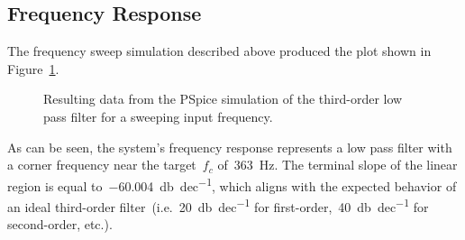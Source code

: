\subsection{Frequency Response}
The frequency sweep simulation described above produced the plot shown in
Figure~\ref{f:bodePlotSim}.
%
\begin{figure}[H]
	\centering
	
	\parbox{.6\textwidth}{
	\caption[Simulated Bode Plot]{Resulting data from the PSpice simulation of
	the third-order low pass filter for a sweeping input frequency.}
	\label{f:bodePlotSim}}
\end{figure}
%
As can be seen, the system's frequency response represents a low pass filter
with a corner frequency near the target~$f_c$ of~\SI{363}{\hertz}.  The
terminal slope of the linear region is equal
to~\SI{-60.004}{\decibel\per dec}, which aligns with the expected behavior
of an ideal third-order filter~(i.e.~\SI{20}{\decibel\per dec} for
first-order,~\SI{40}{\decibel\per dec} for second-order, etc.).

\begin{figure}[H]
	\centering
	
\end{figure}

\begin{figure}[H]
	\centering
	
\end{figure}

\begin{figure}[H]
	\centering
	
\end{figure}
